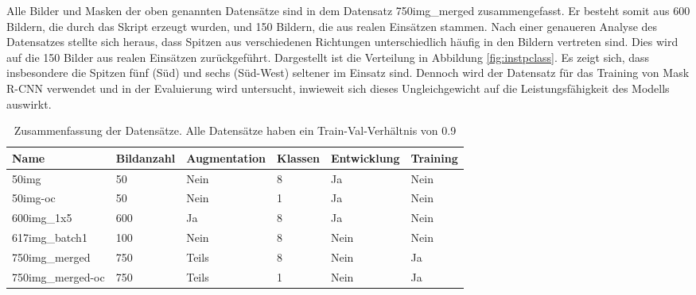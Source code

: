 Alle Bilder und Masken der oben genannten Datensätze sind in dem Datensatz \glqq 750img\_merged\grqq{} zusammengefasst. Er besteht somit aus 600 Bildern, die durch das Skript erzeugt wurden, und 150 Bildern, die aus realen Einsätzen stammen. Nach einer genaueren Analyse des Datensatzes stellte sich heraus, dass Spitzen aus verschiedenen Richtungen unterschiedlich häufig in den Bildern vertreten sind. Dies wird auf die 150 Bilder aus realen Einsätzen zurückgeführt. Dargestellt ist die Verteilung in Abbildung \ref{fig:instpclass}. Es zeigt sich, dass insbesondere die Spitzen fünf (Süd) und sechs (Süd-West) seltener im Einsatz sind. Dennoch wird der Datensatz für das Training von Mask R-CNN verwendet und in der Evaluierung wird untersucht, inwieweit sich dieses Ungleichgewicht auf die Leistungsfähigkeit des Modells auswirkt.
\begin{table}[h]
\begin{adjustbox}{width=\columnwidth,center}
\begin{tabular}{llllll}
\toprule
\textbf{Name} & \textbf{Bildanzahl} & \textbf{Augmentation} & \textbf{Klassen} & \textbf{Entwicklung} & \textbf{Training} \\
\midrule
50img         & 50                  & Nein                     & 8                 & Ja                    & Nein              \\
50img-oc      & 50                  & Nein                   & 1                 & Ja                    & Nein              \\
600img\_1x5        & 600                 & Ja                     & 8                 & Ja                    & Nein              \\
617img\_batch1     & 100                 & Nein                   & 8                 & Nein                  & Nein              \\
750img\_merged        & 750                 & Teils                     & 8                 & Nein                  & Ja                \\
750img\_merged-oc     & 750                 & Teils                     & 1                 & Nein                  & Ja                \\
\bottomrule
\end{tabular}
\end{adjustbox}
\caption{Zusammenfassung der Datensätze. Alle Datensätze haben ein Train-Val-Verhältnis von 0.9}
\label{tab:datasets}
\end{table}

